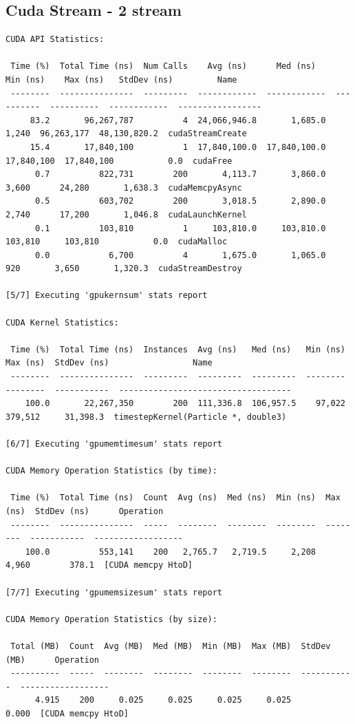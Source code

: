 \documentclass[english]{exam}
\begin{document}
\subsection*{Cuda Stream - 2 stream}

\begin{lstlisting}
CUDA API Statistics:

 Time (%)  Total Time (ns)  Num Calls    Avg (ns)      Med (ns)     Min (ns)    Max (ns)   StdDev (ns)         Name       
 --------  ---------------  ---------  ------------  ------------  ----------  ----------  ------------  -----------------
     83.2       96,267,787          4  24,066,946.8       1,685.0       1,240  96,263,177  48,130,820.2  cudaStreamCreate 
     15.4       17,840,100          1  17,840,100.0  17,840,100.0  17,840,100  17,840,100           0.0  cudaFree         
      0.7          822,731        200       4,113.7       3,860.0       3,600      24,280       1,638.3  cudaMemcpyAsync  
      0.5          603,702        200       3,018.5       2,890.0       2,740      17,200       1,046.8  cudaLaunchKernel 
      0.1          103,810          1     103,810.0     103,810.0     103,810     103,810           0.0  cudaMalloc       
      0.0            6,700          4       1,675.0       1,065.0         920       3,650       1,320.3  cudaStreamDestroy

[5/7] Executing 'gpukernsum' stats report

CUDA Kernel Statistics:

 Time (%)  Total Time (ns)  Instances  Avg (ns)   Med (ns)   Min (ns)  Max (ns)  StdDev (ns)                 Name                
 --------  ---------------  ---------  ---------  ---------  --------  --------  -----------  -----------------------------------
    100.0       22,267,350        200  111,336.8  106,957.5    97,022   379,512     31,398.3  timestepKernel(Particle *, double3)

[6/7] Executing 'gpumemtimesum' stats report

CUDA Memory Operation Statistics (by time):

 Time (%)  Total Time (ns)  Count  Avg (ns)  Med (ns)  Min (ns)  Max (ns)  StdDev (ns)      Operation     
 --------  ---------------  -----  --------  --------  --------  --------  -----------  ------------------
    100.0          553,141    200   2,765.7   2,719.5     2,208     4,960        378.1  [CUDA memcpy HtoD]

[7/7] Executing 'gpumemsizesum' stats report

CUDA Memory Operation Statistics (by size):

 Total (MB)  Count  Avg (MB)  Med (MB)  Min (MB)  Max (MB)  StdDev (MB)      Operation     
 ----------  -----  --------  --------  --------  --------  -----------  ------------------
      4.915    200     0.025     0.025     0.025     0.025        0.000  [CUDA memcpy HtoD]  
\end{lstlisting}
\end{document}
